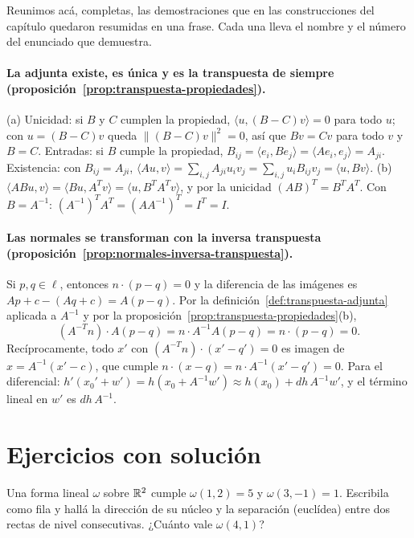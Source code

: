 Reunimos acá, completas, las demostraciones que en las construcciones del capítulo quedaron
resumidas en una frase. Cada una lleva el nombre y el número del enunciado que demuestra.

\paragraph{La adjunta existe, es única y es la transpuesta de siempre
(proposición~\ref{prop:transpuesta-propiedades}).}
\begin{demostracion}
(a) Unicidad: si \(B\) y \(C\) cumplen la propiedad, \(\langle u,(B-C)v\rangle=0\) para todo
\(u\); con \(u=(B-C)v\) queda \(\lVert(B-C)v\rVert^2=0\), así que \(Bv=Cv\) para todo \(v\)
y \(B=C\). Entradas: si \(B\) cumple la propiedad, \(B_{ij}=\langle e_i,Be_j\rangle=
\langle Ae_i,e_j\rangle=A_{ji}\). Existencia: con \(B_{ij}=A_{ji}\),
\(\langle Au,v\rangle=\sum_{i,j}A_{ji}u_iv_j=\sum_{i,j}u_iB_{ij}v_j=\langle u,Bv\rangle\).
(b) \(\langle ABu,v\rangle=\langle Bu,A^Tv\rangle=\langle u,B^TA^Tv\rangle\), y por la
unicidad \((AB)^T=B^TA^T\). Con \(B=A^{-1}\): \((A^{-1})^TA^T=(AA^{-1})^T=I^T=I\).
\end{demostracion}

\paragraph{Las normales se transforman con la inversa transpuesta
(proposición~\ref{prop:normales-inversa-transpuesta}).}
\begin{demostracion}
Si \(p,q\in\ell\), entonces \(n\cdot(p-q)=0\) y la diferencia de las imágenes es
\(Ap+c-(Aq+c)=A(p-q)\). Por la definición~\ref{def:transpuesta-adjunta} aplicada a
\(A^{-1}\) y por la proposición~\ref{prop:transpuesta-propiedades}(b),
\[
  (A^{-T}n)\cdot A(p-q)=n\cdot A^{-1}A(p-q)=n\cdot(p-q)=0 .
\]
Recíprocamente, todo \(x'\) con \((A^{-T}n)\cdot(x'-q')=0\) es imagen de
\(x=A^{-1}(x'-c)\), que cumple \(n\cdot(x-q)=n\cdot A^{-1}(x'-q')=0\). Para el diferencial:
\(h'(x_0'+w')=h(x_0+A^{-1}w')\approx h(x_0)+dh\,A^{-1}w'\), y el término lineal en \(w'\) es
\(dh\,A^{-1}\).
\end{demostracion}

\section{Ejercicios con solución}

\begin{ejercicio}\label{ex:fl-fila}
Una forma lineal \(\omega\) sobre \(\mathbb{R}^2\) cumple \(\omega(1,2)=5\) y \(\omega(3,-1)=1\).
Escribila como fila y hallá la dirección de su núcleo y la separación (euclídea) entre dos
rectas de nivel consecutivas. ¿Cuánto vale \(\omega(4,1)\)?
\end{ejercicio}

